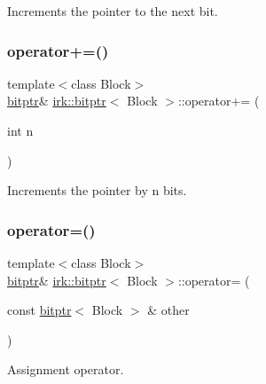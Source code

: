 Increments the pointer to the next bit. 

\mbox{\label{classirk_1_1bitptr_a9fcc393a8789c4500391ff3ff2a9fff7}} 
\subsubsection{\texorpdfstring{operator+=()}{operator+=()}}
{\footnotesize\ttfamily template$<$class Block$>$ \\
\mbox{\hyperlink{classirk_1_1bitptr}{bitptr}}\& \mbox{\hyperlink{classirk_1_1bitptr}{irk\+::bitptr}}$<$ Block $>$\+::operator+= (\begin{DoxyParamCaption}\item[{int}]{n }\end{DoxyParamCaption})\hspace{0.3cm}{\ttfamily [inline]}}



Increments the pointer by {\ttfamily n} bits. 

\mbox{\label{classirk_1_1bitptr_a0ace0c6a50c1a71ef5cb54f0d5cdcf99}} 
\subsubsection{\texorpdfstring{operator=()}{operator=()}\hspace{0.1cm}{\footnotesize\ttfamily [1/2]}}
{\footnotesize\ttfamily template$<$class Block$>$ \\
\mbox{\hyperlink{classirk_1_1bitptr}{bitptr}}\& \mbox{\hyperlink{classirk_1_1bitptr}{irk\+::bitptr}}$<$ Block $>$\+::operator= (\begin{DoxyParamCaption}\item[{const \mbox{\hyperlink{classirk_1_1bitptr}{bitptr}}$<$ Block $>$ \&}]{other }\end{DoxyParamCaption})\hspace{0.3cm}{\ttfamily [inline]}}



Assignment operator. 

\mbox{\label{classirk_1_1bitptr_aed35f1722e462574dfd8409fac0d31b7}} 
